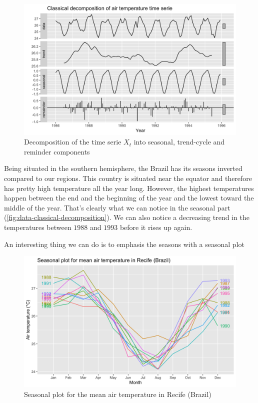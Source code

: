 \begin{figure}[H]
	\centering
	\includegraphics{figures/basic_analysis/time_serie_decomposition.png}
	\caption{Decomposition of the time serie $X_t$ into seasonal, trend-cycle and reminder components}
	\label{fig:data-classical-decomposition}
\end{figure}

Being situated in the southern hemisphere, the Brazil has its seasons inverted compared to our regions. 
This country is situated near the equator and therefore has pretty high temperature all the year long. However, the highest temperatures happen between the end and the beginning of the year and the lowest toward the middle of the year. That's clearly what we can notice in the seasonal part (\autoref{fig:data-classical-decomposition}). We can also notice a decreasing trend in the temperatures between $1988$ and $1993$ before it rises up again.

An interesting thing we can do is to emphasis the seasons with a seasonal plot 

\begin{figure}[H]
	\centering
	\includegraphics{figures/basic_analysis/time_serie_seasonal_plot.png}
	\caption{Seasonal plot for the mean air temperature in Recife (Brazil)}
	\label{fig:seasonal-plot}
\end{figure}